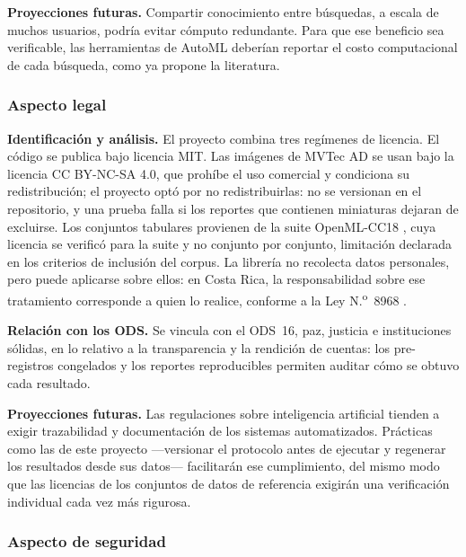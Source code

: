 \textbf{Proyecciones futuras.} Compartir conocimiento entre búsquedas, a escala de muchos
usuarios, podría evitar cómputo redundante. Para que ese beneficio sea verificable, las
herramientas de AutoML deberían reportar el costo computacional de cada búsqueda, como ya
propone la literatura.

\subsubsection*{Aspecto legal}

\textbf{Identificación y análisis.} El proyecto combina tres regímenes de licencia. El código
se publica bajo licencia MIT. Las imágenes de MVTec AD \cite{bergmann2019mvtec} se usan bajo
la licencia CC BY-NC-SA 4.0, que prohíbe el uso comercial y condiciona su redistribución; el
proyecto optó por no redistribuirlas: no se versionan en el repositorio, y una prueba falla si
los reportes que contienen miniaturas dejaran de excluirse. Los conjuntos tabulares provienen de la suite OpenML-CC18
\cite{openml-cc18}, cuya licencia se verificó para la suite y no conjunto por conjunto,
limitación declarada en los criterios de inclusión del corpus. La librería no recolecta datos
personales, pero puede aplicarse sobre ellos: en Costa Rica, la responsabilidad sobre ese
tratamiento corresponde a quien lo realice, conforme a la Ley N.\textsuperscript{o}~8968
\cite{ley8968}.

\textbf{Relación con los ODS.} Se vincula con el ODS~16, paz, justicia e instituciones sólidas,
en lo relativo a la transparencia y la rendición de cuentas: los pre-registros congelados y
los reportes reproducibles permiten auditar cómo se obtuvo cada resultado.

\textbf{Proyecciones futuras.} Las regulaciones sobre inteligencia artificial tienden a exigir
trazabilidad y documentación de los sistemas automatizados. Prácticas como las de este
proyecto ---versionar el protocolo antes de ejecutar y regenerar los resultados desde sus
datos--- facilitarán ese cumplimiento, del mismo modo que las licencias de los conjuntos de
datos de referencia exigirán una verificación individual cada vez más rigurosa.

\subsubsection*{Aspecto de seguridad}

